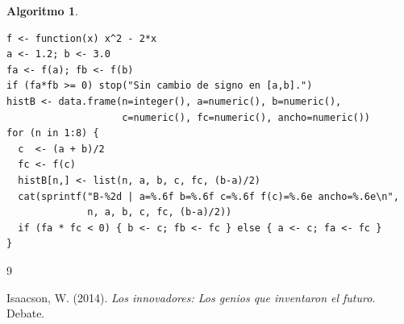 \documentclass[12pt]{article}
\newtheorem{Algthm}{Algoritmo}
\begin{document}
\begin{Algthm}
\begin{verbatim}
f <- function(x) x^2 - 2*x
a <- 1.2; b <- 3.0
fa <- f(a); fb <- f(b)
if (fa*fb >= 0) stop("Sin cambio de signo en [a,b].")
histB <- data.frame(n=integer(), a=numeric(), b=numeric(),
                    c=numeric(), fc=numeric(), ancho=numeric())
for (n in 1:8) {
  c  <- (a + b)/2
  fc <- f(c)
  histB[n,] <- list(n, a, b, c, fc, (b-a)/2)
  cat(sprintf("B-%2d | a=%.6f b=%.6f c=%.6f f(c)=%.6e ancho=%.6e\n",
              n, a, b, c, fc, (b-a)/2))
  if (fa * fc < 0) { b <- c; fb <- fc } else { a <- c; fa <- fc }
}
\end{verbatim}
\end{Algthm}


\begin{thebibliography}{9}

Isaacson, W. (2014). 
\textit{Los innovadores: Los genios que inventaron el futuro}. 
Debate.

\end{thebibliography}
\end{document}
